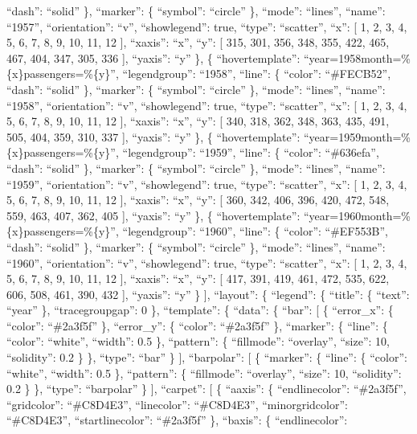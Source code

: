 \documentclass[
]{article}
\begin{document}
``dash'': ``solid'' \}, ``marker'': \{ ``symbol'': ``circle'' \},
``mode'': ``lines'', ``name'': ``1957'', ``orientation'': ``v'',
``showlegend'': true, ``type'': ``scatter'', ``x'': {[} 1, 2, 3, 4, 5,
6, 7, 8, 9, 10, 11, 12 {]}, ``xaxis'': ``x'', ``y'': {[} 315, 301, 356,
348, 355, 422, 465, 467, 404, 347, 305, 336 {]}, ``yaxis'': ``y'' \}, \{
``hovertemplate'': ``year=1958month=\%\{x\}passengers=\%\{y\}'',
``legendgroup'': ``1958'', ``line'': \{ ``color'': ``\#FECB52'',
``dash'': ``solid'' \}, ``marker'': \{ ``symbol'': ``circle'' \},
``mode'': ``lines'', ``name'': ``1958'', ``orientation'': ``v'',
``showlegend'': true, ``type'': ``scatter'', ``x'': {[} 1, 2, 3, 4, 5,
6, 7, 8, 9, 10, 11, 12 {]}, ``xaxis'': ``x'', ``y'': {[} 340, 318, 362,
348, 363, 435, 491, 505, 404, 359, 310, 337 {]}, ``yaxis'': ``y'' \}, \{
``hovertemplate'': ``year=1959month=\%\{x\}passengers=\%\{y\}'',
``legendgroup'': ``1959'', ``line'': \{ ``color'': ``\#636efa'',
``dash'': ``solid'' \}, ``marker'': \{ ``symbol'': ``circle'' \},
``mode'': ``lines'', ``name'': ``1959'', ``orientation'': ``v'',
``showlegend'': true, ``type'': ``scatter'', ``x'': {[} 1, 2, 3, 4, 5,
6, 7, 8, 9, 10, 11, 12 {]}, ``xaxis'': ``x'', ``y'': {[} 360, 342, 406,
396, 420, 472, 548, 559, 463, 407, 362, 405 {]}, ``yaxis'': ``y'' \}, \{
``hovertemplate'': ``year=1960month=\%\{x\}passengers=\%\{y\}'',
``legendgroup'': ``1960'', ``line'': \{ ``color'': ``\#EF553B'',
``dash'': ``solid'' \}, ``marker'': \{ ``symbol'': ``circle'' \},
``mode'': ``lines'', ``name'': ``1960'', ``orientation'': ``v'',
``showlegend'': true, ``type'': ``scatter'', ``x'': {[} 1, 2, 3, 4, 5,
6, 7, 8, 9, 10, 11, 12 {]}, ``xaxis'': ``x'', ``y'': {[} 417, 391, 419,
461, 472, 535, 622, 606, 508, 461, 390, 432 {]}, ``yaxis'': ``y'' \}
{]}, ``layout'': \{ ``legend'': \{ ``title'': \{ ``text'': ``year'' \},
``tracegroupgap'': 0 \}, ``template'': \{ ``data'': \{ ``bar'': {[} \{
``error\_x'': \{ ``color'': ``\#2a3f5f'' \}, ``error\_y'': \{ ``color'':
``\#2a3f5f'' \}, ``marker'': \{ ``line'': \{ ``color'': ``white'',
``width'': 0.5 \}, ``pattern'': \{ ``fillmode'': ``overlay'', ``size'':
10, ``solidity'': 0.2 \} \}, ``type'': ``bar'' \} {]}, ``barpolar'': {[}
\{ ``marker'': \{ ``line'': \{ ``color'': ``white'', ``width'': 0.5 \},
``pattern'': \{ ``fillmode'': ``overlay'', ``size'': 10, ``solidity'':
0.2 \} \}, ``type'': ``barpolar'' \} {]}, ``carpet'': {[} \{ ``aaxis'':
\{ ``endlinecolor'': ``\#2a3f5f'', ``gridcolor'': ``\#C8D4E3'',
``linecolor'': ``\#C8D4E3'', ``minorgridcolor'': ``\#C8D4E3'',
``startlinecolor'': ``\#2a3f5f'' \}, ``baxis'': \{ ``endlinecolor'':
\end{document}
